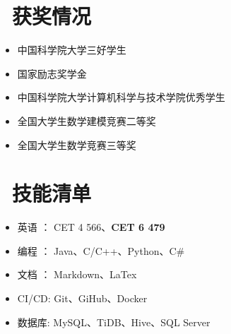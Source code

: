 \documentclass{resume}
\begin{document}

\section{\faHeartO\ 获奖情况}
\begin{itemize}[parsep=0.5ex]
  \item 中国科学院大学三好学生
  \item 国家励志奖学金
  \item 中国科学院大学计算机科学与技术学院优秀学生
  \item 全国大学生数学建模竞赛二等奖
  \item 全国大学生数学竞赛三等奖
\end{itemize}

\section{\faCogs\ 技能清单}
\begin{itemize}[parsep=0.5ex]
  \item 英语 ：		   CET 4 566、\textbf{CET 6 479}
  \item 编程 ：		   Java、C/C++、Python、C\#
  \item 文档 ：		   Markdown、LaTex
  \item CI/CD:		  Git、GiHub、Docker
  \item 数据库:		   MySQL、TiDB、Hive、SQL Server
  
\end{itemize}



%
%
\end{document}
